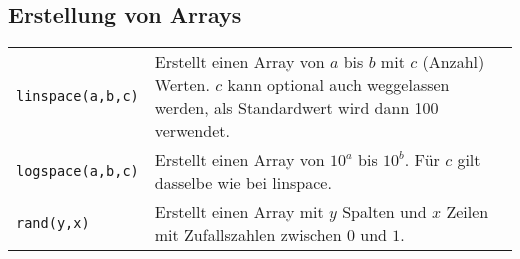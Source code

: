 \subsection{Erstellung von Arrays}
\begin{tabularx}{\textwidth}{p{3cm} p{15cm}}
    \texttt{linspace(a,b,c)} &
    Erstellt einen Array von $a$ bis $b$ mit $c$ (Anzahl) Werten. $c$ kann
    optional auch weggelassen werden, als Standardwert wird dann 100 verwendet.
  \\
    \texttt{logspace(a,b,c)} &
    Erstellt einen Array von $10^a$ bis $10^b$. Für $c$ gilt dasselbe wie bei
    linspace.
  \\
    \texttt{rand(y,x)} &
    Erstellt einen Array mit $y$ Spalten und $x$ Zeilen mit Zufallszahlen
    zwischen $0$ und $1$.
\end{tabularx}